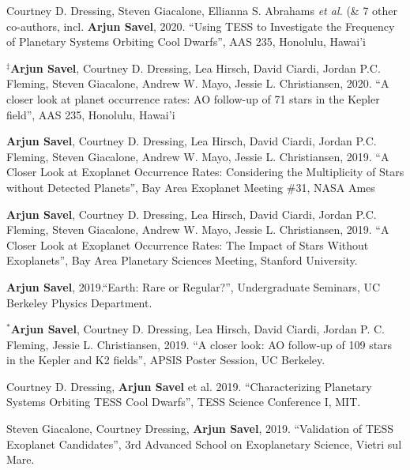\documentclass[12pt,letterpaper]{article}
\begin{document}
\begin{list}{}{\cvlist}

\item[{\color{numcolor}\scriptsize8}] Courtney D. Dressing, Steven Giacalone, Ellianna S. Abrahams \emph{et al.} (\& 7 other co-authors, incl. \textbf{Arjun Savel}, 2020. ``Using TESS to Investigate the Frequency of Planetary Systems Orbiting Cool Dwarfs'', AAS 235, Honolulu, Hawai'i

\item[{\color{numcolor}\scriptsize7}] $^\ddagger$\textbf{Arjun Savel}, Courtney D. Dressing, Lea Hirsch, David Ciardi, Jordan P.C. Fleming, Steven Giacalone, Andrew W. Mayo, Jessie L. Christiansen, 2020. “A closer look at planet occurrence rates: AO follow-up of 71 stars in the Kepler field”, AAS 235, Honolulu, Hawai'i

\item[{\color{numcolor}\scriptsize6}] \textbf{Arjun Savel}, Courtney D. Dressing, Lea Hirsch, David Ciardi, Jordan P.C. Fleming, Steven Giacalone, Andrew W. Mayo, Jessie L. Christiansen, 2019. “A Closer Look at Exoplanet Occurrence Rates: Considering the Multiplicity of Stars without Detected Planets”, Bay Area Exoplanet Meeting \#31, NASA Ames

\item[{\color{numcolor}\scriptsize5}] \textbf{Arjun Savel}, Courtney D. Dressing, Lea Hirsch, David Ciardi, Jordan P.C. Fleming, Steven Giacalone, Andrew W. Mayo, Jessie L. Christiansen, 2019. “A Closer Look at Exoplanet Occurrence Rates: The Impact of Stars Without Exoplanets”, Bay Area Planetary Sciences Meeting, Stanford University.

\item[{\color{numcolor}\scriptsize4}] \textbf{Arjun Savel}, 2019.“Earth: Rare or Regular?”, Undergraduate Seminars, UC Berkeley Physics Department.

\item[{\color{numcolor}\scriptsize3}] $^*$\textbf{Arjun Savel}, Courtney D. Dressing, Lea Hirsch, David Ciardi, Jordan P. C. Fleming, Jessie L. Christiansen, 2019. “A closer look: AO follow-up of 109 stars in the Kepler and K2 fields”, APSIS Poster Session, UC Berkeley.

\item[{\color{numcolor}\scriptsize2}] Courtney D. Dressing, \textbf{Arjun Savel} et al. 2019. “Characterizing Planetary Systems Orbiting TESS Cool Dwarfs”, TESS Science Conference I, MIT.

\item[{\color{numcolor}\scriptsize1}] Steven Giacalone, Courtney Dressing, \textbf{Arjun Savel}, 2019. “Validation of TESS Exoplanet Candidates”, 3rd Advanced School on Exoplanetary Science, Vietri sul Mare.

\end{list}
\end{document}

